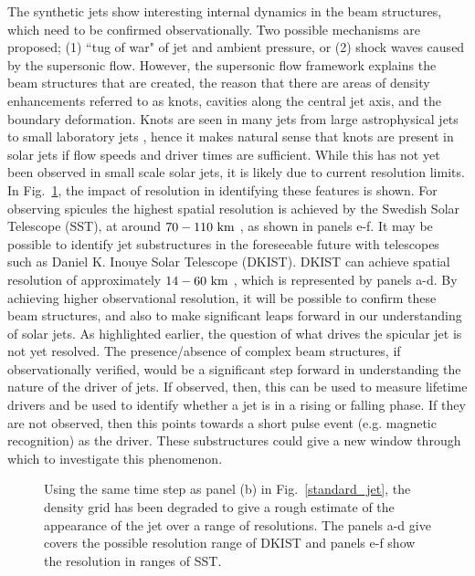 %
The synthetic jets show interesting internal dynamics in the beam structures, which need to be confirmed observationally. Two possible mechanisms are proposed; (1) ``tug of war" of jet and ambient pressure, or (2) shock waves caused by the supersonic flow. However, the supersonic flow framework explains the beam structures that are created, the reason that there are areas of density enhancements referred to as knots, cavities along the central jet axis, and the boundary deformation. Knots are seen in many jets from large astrophysical jets \citep{van_Putten_1996ApJ467L57V, DeGouveiaDalPino2005, Hada2013ApJ77570H, Cohen2014ApJ787151C, Hervet2017AnA606A103H} to small laboratory jets \citep{Menon2010, Edgington-Mitchell2014, Ono2014}, hence it makes natural sense that knots are present in solar jets if flow speeds and driver times are sufficient. While this has not yet been observed in small scale solar jets, it is likely due to current resolution limits. In Fig.~\ref{degrid}, the impact of resolution in identifying these features is shown. For observing spicules the highest spatial resolution is achieved by the Swedish Solar Telescope (SST), at around $70-110~\rm{km}$ \citep{Scharmer2003SPIE,Berger2003ApJ}, as shown in panels e-f. It may be possible to identify jet substructures in the foreseeable future with telescopes such as Daniel K. Inouye Solar Telescope (DKIST). DKIST can achieve spatial resolution of approximately $14-60~\rm{km}$ \citep{Rast2020arXiv,Rimmele2020SoPh}, which is represented by panels a-d. By achieving higher observational resolution, it will be possible to confirm these beam structures, and also to make significant leaps forward in our understanding of solar jets. \np
%
As highlighted earlier, the question of what drives the spicular jet is not yet resolved. The presence/absence of complex beam structures, if observationally verified, would be a significant step forward in understanding the nature of the driver of jets. If observed, then, this can be used to measure lifetime drivers and be used to identify whether a jet is in a rising or falling phase. If they are not observed, then this points towards a short pulse event (e.g. magnetic recognition) as the driver. These substructures could give a new window through which to investigate this phenomenon.
\begin{figure}
\captionsetup[subfigure]{labelformat=empty}
\centering
{}
\caption{Using the same time step as panel (b) in Fig.~\ref{standard_jet}, the density grid has been degraded to give a rough estimate of the appearance of the jet over a range of resolutions. The panels a-d give covers the possible resolution range of DKIST and panels e-f show the resolution in ranges of SST.}
\label{degrid}
\end{figure}